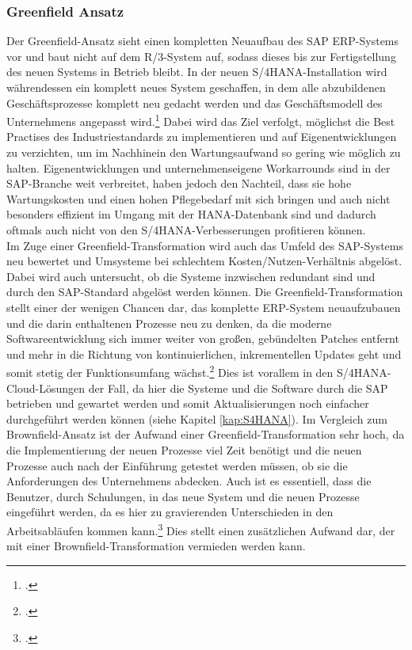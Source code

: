 \subsubsection{Greenfield Ansatz}
Der Greenfield-Ansatz sieht einen kompletten Neuaufbau des SAP ERP-Systems vor und baut nicht auf dem R/3-System auf, sodass dieses bis zur Fertigstellung des neuen Systems in Betrieb bleibt. In der neuen S/4HANA-Installation wird währendessen ein komplett neues System geschaffen, in dem alle abzubildenen Geschäftsprozesse komplett neu gedacht werden und das Geschäftsmodell des Unternehmens angepasst wird.\footcite[Vgl.][]{ao-blog} Dabei wird das Ziel verfolgt, möglichst die \glqq{}Best Practises\grqq{} des Industriestandards zu implementieren und auf Eigenentwicklungen zu verzichten, um im Nachhinein den Wartungsaufwand so gering wie möglich zu halten. Eigenentwicklungen und unternehmenseigene Workarrounds sind in der SAP-Branche weit verbreitet, haben jedoch den Nachteil, dass sie hohe Wartungskosten und einen hohen Pflegebedarf mit sich bringen und auch nicht besonders effizient im Umgang mit der HANA-Datenbank sind und dadurch oftmals auch nicht von den S/4HANA-Verbesserungen profitieren können.\\Im Zuge einer Greenfield-Transformation wird auch das Umfeld des SAP-Systems neu bewertet und Umsysteme bei schlechtem Kosten/Nutzen-Verhältnis abgelöst. Dabei wird auch untersucht, ob die Systeme inzwischen redundant sind und durch den SAP-Standard abgelöst werden können. Die Greenfield-Transformation stellt einer der wenigen Chancen dar, das komplette ERP-System neuaufzubauen und die darin enthaltenen Prozesse neu zu denken, da die moderne Softwareentwicklung sich immer weiter von großen, gebündelten Patches entfernt und mehr in die Richtung von kontinuierlichen, inkrementellen Updates geht und somit stetig der Funktionsumfang wächst.\footcite[Vgl.][]{gambit-transformation} Dies ist vorallem in den S/4HANA-Cloud-Lösungen der Fall, da hier die Systeme und die Software durch die SAP betrieben und gewartet werden und somit Aktualisierungen noch einfacher durchgeführt werden können (siehe Kapitel \ref{kap:S4HANA}). Im Vergleich zum Brownfield-Ansatz ist der Aufwand einer Greenfield-Transformation sehr hoch, da die Implementierung der neuen Prozesse viel Zeit benötigt und die neuen Prozesse auch nach der Einführung getestet werden müssen, ob sie die Anforderungen des Unternehmens abdecken. Auch ist es essentiell, dass die Benutzer, durch Schulungen, in das neue System und die neuen Prozesse eingeführt werden, da es hier zu gravierenden Unterschieden in den Arbeitsabläufen kommen kann.\footcite[Vgl.][]{gambit-transformation} Dies stellt einen zusätzlichen Aufwand dar, der mit einer Brownfield-Transformation vermieden werden kann.

